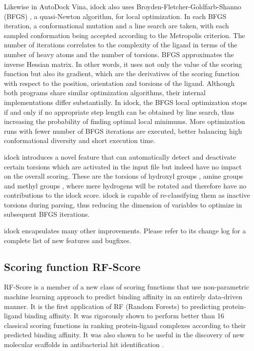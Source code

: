 Likewise in AutoDock Vina, idock also uses Broyden-Fletcher-Goldfarb-Shanno (BFGS) \citep{786}, a quasi-Newton algorithm, for local optimization. In each BFGS iteration, a conformational mutation and a line search are taken, with each sampled conformation being accepted according to the Metropolis criterion. The number of iterations correlates to the complexity of the ligand in terms of the number of heavy atoms and the number of torsions. BFGS approximates the inverse Hessian matrix. In other words, it uses not only the value of the scoring function but also its gradient, which are the derivatives of the scoring function with respect to the position, orientation and torsions of the ligand. Although both programs share similar optimization algorithms, their internal implementations differ substantially. In idock, the BFGS local optimization stops if and only if no appropriate step length can be obtained by line search, thus increasing the probability of finding optimal local minimums. More optimization runs with fewer number of BFGS iterations are executed, better balancing high conformational diversity and short execution time.

idock introduces a novel feature that can automatically detect and deactivate certain torsions which are activated in the input file but indeed have no impact on the overall scoring. These are the torsions of hydroxyl groups , amine groups  and methyl groups , where mere hydrogens will be rotated and therefore have no contributions to the idock score. idock is capable of re-classifying them as inactive torsions during parsing, thus reducing the dimension of variables to optimize in subsequent BFGS iterations.

idock encapsulates many other improvements. Please refer to its change log for a complete list of new features and bugfixes.

\subsection{Scoring function RF-Score}

RF-Score \citep{564} is a member of a new class of scoring functions that use non-parametric machine learning approach to predict binding affinity in an entirely data-driven manner. It is the first application of RF (Random Forests) \citep{1309} to predicting protein-ligand binding affinity. It was rigorously shown \citep{564} to perform better than 16 classical scoring functions in ranking protein-ligand complexes according to their predicted binding affinity. It was also shown to be useful in the discovery of new molecular scaffolds in antibacterial hit identification \citep{1281}.

